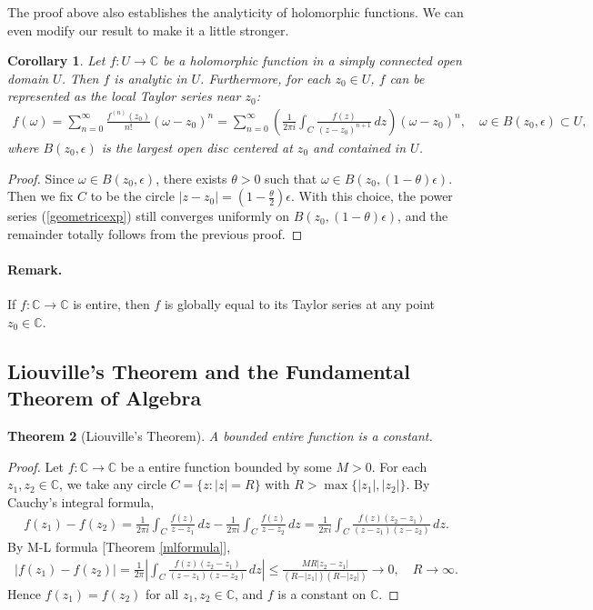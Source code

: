\documentclass{article}
\numberwithin{equation}{section}
\newcommand{\bbC}{\mathbb{C}}
\theoremstyle{plain}
\newtheorem{theorem}{Theorem}[section]
\newtheorem{corollary}[theorem]{Corollary}
\theoremstyle{definition}
\begin{document}
The proof above also establishes the analyticity of holomorphic functions. We can even modify our result to make it a little stronger.
\begin{corollary}
Let $f:U\to\bbC$ be a holomorphic function in a simply connected open domain $U$. Then $f$ is analytic in $U$. Furthermore, for each $z_0\in U$, $f$ can be represented as the local Taylor series near $z_0$:
\begin{align*}
	f(\omega)=\sum_{n=0}^\infty\frac{f^{(n)}(z_0)}{n!}(\omega-z_0)^n=\sum_{n=0}^\infty\left(\frac{1}{2\pi i}\int_C\frac{f(z)}{(z-z_0)^{n+1}}\,dz\right)(\omega-z_0)^n,\quad \omega\in B(z_0,\epsilon)\subset U,
\end{align*}
where $B(z_0,\epsilon)$ is the largest open disc centered at $z_0$ and contained in $U$.
\end{corollary}
\begin{proof}
Since $\omega\in B(z_0,\epsilon)$, there exists $\theta>0$ such that $\omega\in B(z_0,(1-\theta)\epsilon)$. Then we fix $C$ to be the circle $\vert z-z_0\vert=(1-\frac{\theta}{2})\epsilon$. With this choice, the power series (\ref{geometricexp}) still converges uniformly on $B(z_0,(1-\theta)\epsilon)$, and the remainder totally follows from the previous proof.
\end{proof}

\paragraph{Remark.} If $f:\bbC\to\bbC$ is entire, then $f$ is globally equal to its Taylor series at any point $z_0\in\bbC$.

\subsection{Liouville's Theorem and the Fundamental Theorem of Algebra}
\begin{theorem}[Liouville's Theorem]\label{liouvillethm}
A bounded entire function is a constant.
\end{theorem}
\begin{proof}
Let $f:\bbC\to\bbC$ be a entire function bounded by some $M>0$. For each  $z_1,z_2\in\bbC$, we take any circle $C=\{z:\vert z\vert=R\}$ with $R>\max\{\vert z_1\vert,\vert z_2\vert\}$. By Cauchy's integral formula,
\begin{align*}
	f(z_1)-f(z_2)=\frac{1}{2\pi i}\int_C\frac{f(z)}{z-z_1}\,dz-\frac{1}{2\pi i}\int_C\frac{f(z)}{z-z_2}\,dz=\frac{1}{2\pi i}\int_C\frac{f(z)(z_2-z_1)}{(z-z_1)(z-z_2)}\,dz.
\end{align*}
By M-L formula [Theorem \ref{mlformula}],
\begin{align*}
	\left\vert f(z_1)-f(z_2)\right\vert=\frac{1}{2\pi}\left\vert\int_C\frac{f(z)(z_2-z_1)}{(z-z_1)(z-z_2)}\,dz\right\vert\leq\frac{MR\left\vert z_2-z_1\right\vert}{(R-\vert z_1\vert)(R-\vert z_2\vert)}\to 0,\quad R\to\infty.
\end{align*}
Hence $f(z_1)=f(z_2)$ for all $z_1,z_2\in\bbC$, and $f$ is a constant on $\bbC$.
\end{proof}
\end{document}
